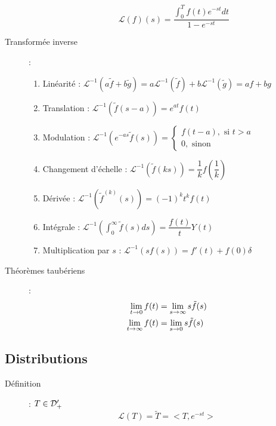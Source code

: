 \begin{description}
\begin{multicols}{2}
\begin{enumerate}
\[            \mathcal L(f)(s)=\frac{\int_0^Tf(t)e^{-st}dt}{1-e^{-st}}
        \]
    \end{enumerate}
\end{multicols}
\item[Transformée inverse] :
\begin{enumerate}
    \item Linéarité : $\mathcal L^{-1}(a\tilde f+b\tilde g)=a\mathcal L^{-1}(\tilde f)+b\mathcal L^{-1}(\tilde g)=af+bg$
    \item Translation : $\mathcal L^{-1}(\tilde f(s-a))=e^{at}f(t)$
    \item Modulation : $\mathcal L^{-1}(e^{-as}\tilde f(s))=\begin{cases}f(t-a),\textrm{ si }t>a\\ 0,\textrm{ sinon}\end{cases}$
    \item Changement d'échelle : $\mathcal L^{-1}(\tilde f(ks))=\dfrac{1}{k}f\left(\dfrac{1}{k}\right)$
    \item Dérivée : $\mathcal L^{-1}(\tilde f^{(k)}(s))=(-1)^kt^kf(t)$
    \item Intégrale : $\mathcal L^{-1}\left(\int_0^\infty\tilde f(s)ds\right)=\dfrac{f(t)}{t}Y(t)$
    \item Multiplication par $s$ : $\mathcal L^{-1}(sf(s))=f'(t)+f(0)\delta$
\end{enumerate}
\item[Théorèmes taubériens] :
    \begin{align*}
        \lim_{t\rightarrow0}f(t)&=\lim_{s\rightarrow\infty}s\tilde f(s)\\
        \lim_{t\rightarrow\infty}f(t)&=\lim_{s\rightarrow0}s\tilde f(s)
    \end{align*}
\end{description}
\subsection{Distributions}
\begin{description}
\item[Définition] : $T\in\mathcal{D}'_+$
    \[
        \mathcal L(T)=\tilde T=<T,e^{-st}>
    \]
\end{description}